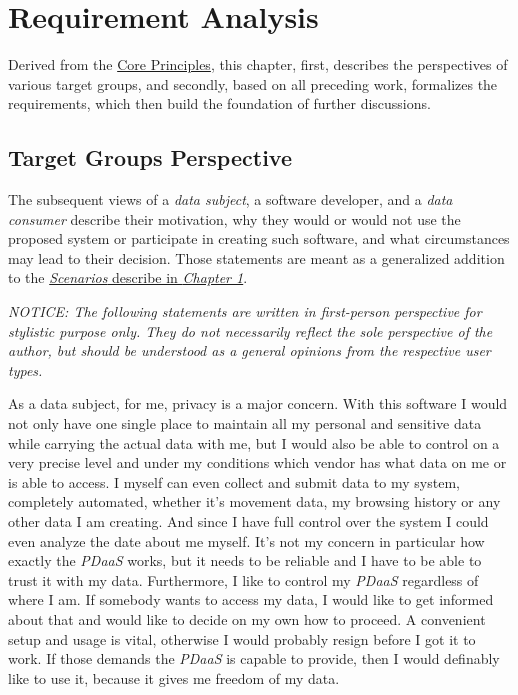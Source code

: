 \documentclass[12pt,english,a4paper,titlepage,cleardoublepage=empty,dottedtoc]{report}
\begin{document}
\chapter{Requirement Analysis}\label{requirement-analysis}

Derived from the \protect\hyperlink{core-principles}{Core Principles},
this chapter, first, describes the perspectives of various target
groups, and secondly, based on all preceding work, formalizes the
requirements, which then build the foundation of further discussions.

\hypertarget{target-groups-perspective}{\section{Target Groups
Perspective}\label{target-groups-perspective}}

The subsequent views of a \emph{data subject}, a software developer, and
a \emph{data consumer} describe their motivation, why they would or
would not use the proposed system or participate in creating such
software, and what circumstances may lead to their decision. Those
statements are meant as a generalized addition to the
\protect\hyperlink{scenarios}{\emph{Scenarios} describe in \emph{Chapter
1}}.

\emph{NOTICE: The following statements are written in first-person
perspective for stylistic purpose only. They do not necessarily reflect
the sole perspective of the author, but should be understood as a
general opinions from the respective user types.}

As a data subject, for me, privacy is a major concern. With this
software I would not only have one single place to maintain all my
personal and sensitive data while carrying the actual data with me, but
I would also be able to control on a very precise level and under my
conditions which vendor has what data on me or is able to access. I
myself can even collect and submit data to my system, completely
automated, whether it's movement data, my browsing history or any other
data I am creating. And since I have full control over the system I
could even analyze the date about me myself. It's not my concern in
particular how exactly the \emph{PDaaS} works, but it needs to be
reliable and I have to be able to trust it with my data. Furthermore, I
like to control my \emph{PDaaS} regardless of where I am. If somebody
wants to access my data, I would like to get informed about that and
would like to decide on my own how to proceed. A convenient setup and
usage is vital, otherwise I would probably resign before I got it to
work. If those demands the \emph{PDaaS} is capable to provide, then I
would definably like to use it, because it gives me freedom of my data.
\end{document}
